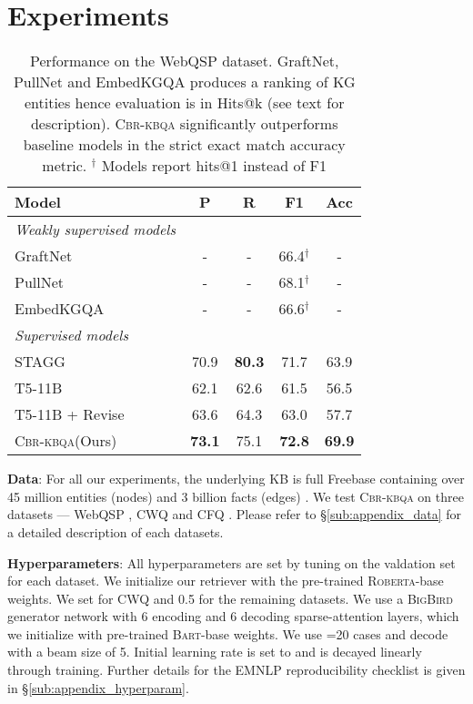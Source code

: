 \documentclass[11pt]{article}
\newcommand{\roberta}{\textsc{Roberta}\xspace}
\newcommand{\bigb}{\textsc{BigBird}\xspace}
\newcommand{\alg}{\textsc{Cbr-kbqa}\xspace}
\begin{document}
\section{Experiments}
\label{sec:experiments}
\begin{table}[t]
\centering
    \footnotesize
    \setlength{\tabcolsep}{3pt}
    \begin{tabular}{@{}l@{\hskip 0pt}c c c c@{}}
    \toprule
    Model & P & R & F1 & Acc\\\midrule
    \textit{Weakly supervised models} & & & & \\\midrule
GraftNet \cite{sun2018open} & - & - & 66.4\ensuremath{^\dagger} & - \\
    PullNet \cite{sun2019pullnet} & - & - & 68.1\ensuremath{^\dagger} & - \\
    EmbedKGQA \cite{saxena2020improving} & - & - & 66.6\ensuremath{^\dagger} & - \\
    \midrule
    \textit{Supervised models} & & & & \\\midrule
    STAGG \cite{yih2016value} & 70.9 & \textbf{80.3} & 71.7 & 63.9\\
    T5-11B \cite{t5} &62.1 & 62.6& 61.5& 56.5\\
    T5-11B + Revise &63.6 & 64.3& 63.0& 57.7\\
    \alg (Ours) & \textbf{73.1} & 75.1 & \textbf{72.8} & \textbf{69.9}\\\bottomrule
    
    \end{tabular}
    \caption{Performance on the WebQSP dataset. GraftNet, PullNet and EmbedKGQA produces a ranking of KG entities hence evaluation is in Hits@k (see text for description). \alg significantly outperforms baseline models in the strict exact match accuracy metric. \ensuremath{^\dagger} Models report hits@1 instead of F1}
    \label{tab:webqsp_results}
    \vspace{-3mm}
\end{table}

\noindent\textbf{Data}: For all our experiments, the underlying KB is full Freebase containing over 45 million entities (nodes) and 3 billion facts (edges) \cite{fb}. We test \alg on three datasets --- WebQSP \cite{yih2016value}, CWQ \cite{Talmor2018TheWA} and CFQ \cite{keysers2020measuring}. Please refer to \S\ref{sub:appendix_data} for a detailed description of each datasets.

\noindent\textbf{Hyperparameters}: All hyperparameters are set by tuning on the valdation set for each dataset. We initialize our retriever with the pre-trained \roberta-base weights. We set  for CWQ and 0.5 for the remaining datasets. We use a \bigb generator network with 6 encoding and 6 decoding sparse-attention layers, which we initialize with pre-trained \textsc{Bart}-base weights. We use =20 cases and decode with a beam size of 5. Initial learning rate is set to  and is decayed linearly through training. Further details for the EMNLP reproducibility checklist is given in \S\ref{sub:appendix_hyperparam}.
\end{document}

